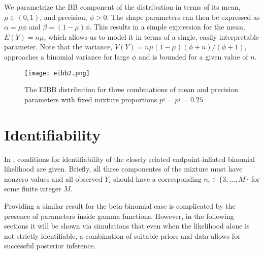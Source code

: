 We parametrize the BB component of the distribution in terms of its mean, $\mu \in (0,1)$, and precision, $\phi > 0$. The shape parameters can then be expressed as $\alpha = \mu\phi$ and $\beta = (1-\mu)\phi$. This results in a simple expression for the mean, $E(Y) = n\mu$, which allows us to model it in terms of a single, easily interpretable parameter. Note that the variance, $V(Y) = n\mu(1-\mu)(\phi+n)/(\phi+1)$, approaches a binomial variance for large $\phi$ and is bounded for a given value of $n$.\\

\begin{figure}
  \texttt{[image: eibb2.png]}
  \caption{The EIBB distribution for three combinations of mean and precision parameters with fixed mixture proportions $p^{_0} = p^{_1} = 0.25$}
  \label{fig:eibb}
\end{figure}

\section{Identifiability}
\label{sec:ident}

In \cite{Dupuy2017}, conditions for identifiability of the closely related endpoint-inflated binomial likelihood are given. Briefly, all three componentes of the mixture must have nonzero values and all observed $Y_i$ should have a corresponding $n_i \in \{3,...,M\}$ for some finite integer $M$.

Providing a similar result for the beta-binomial case is complicated by the presence of parameters inside gamma functions. However, in the following sections it will be shown via simulations that even when the likelihood alone is not strictly identifiable, a combination of suitable priors and data allows for successful posterior inference.